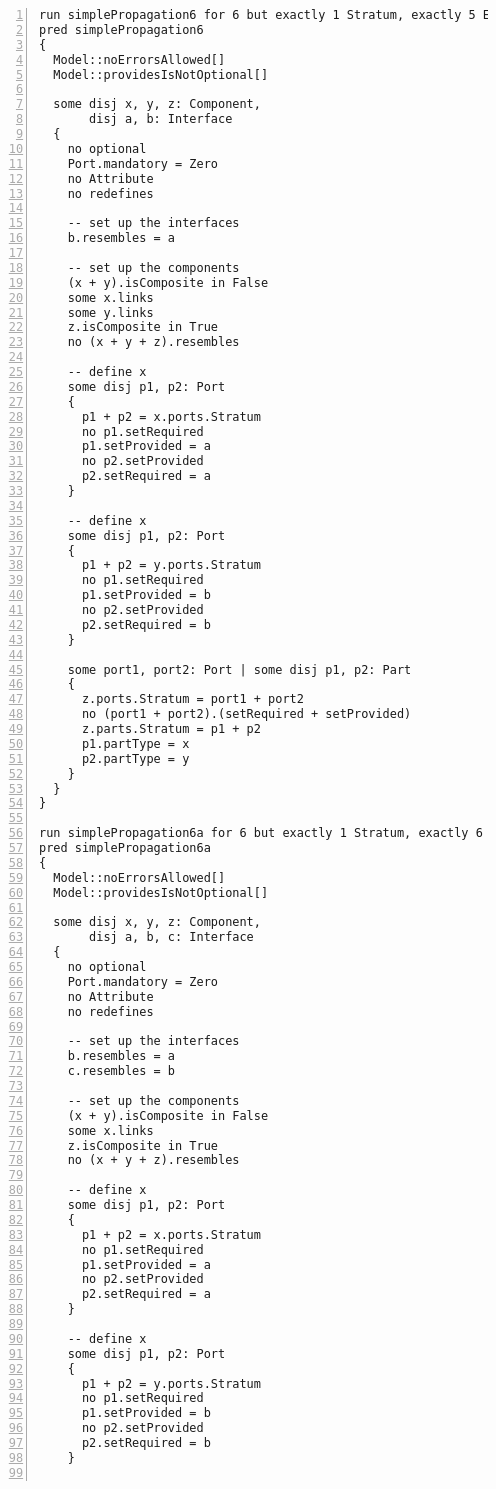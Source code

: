 \begin{lstlisting}[caption={unittests\_inference.als}, numbers=left]
run simplePropagation6 for 6 but exactly 1 Stratum, exactly 5 Element, exactly 6 Port, exactly 2 Part, exactly 3 Component, exactly 2 Interface, exactly 3 Connector, 10 LinkEnd, 6 ConnectorEnd
pred simplePropagation6
{
  Model::noErrorsAllowed[]
  Model::providesIsNotOptional[]

  some disj x, y, z: Component,
       disj a, b: Interface
  {
    no optional
    Port.mandatory = Zero
    no Attribute
    no redefines
  
    -- set up the interfaces
    b.resembles = a    
  
    -- set up the components
    (x + y).isComposite in False
    some x.links
    some y.links
    z.isComposite in True
    no (x + y + z).resembles
    
    -- define x
    some disj p1, p2: Port
    {
      p1 + p2 = x.ports.Stratum
      no p1.setRequired
      p1.setProvided = a
      no p2.setProvided
      p2.setRequired = a
    }
    
    -- define x
    some disj p1, p2: Port
    {
      p1 + p2 = y.ports.Stratum
      no p1.setRequired
      p1.setProvided = b
      no p2.setProvided
      p2.setRequired = b
    }
    
    some port1, port2: Port | some disj p1, p2: Part
    {
      z.ports.Stratum = port1 + port2
      no (port1 + port2).(setRequired + setProvided)
      z.parts.Stratum = p1 + p2
      p1.partType = x
      p2.partType = y
    }
  }
}

run simplePropagation6a for 6 but exactly 1 Stratum, exactly 6 Element, exactly 6 Port, exactly 2 Part, exactly 3 Component, exactly 3 Interface, exactly 3 Connector, 10 LinkEnd, 6 ConnectorEnd
pred simplePropagation6a
{
  Model::noErrorsAllowed[]
  Model::providesIsNotOptional[]

  some disj x, y, z: Component,
       disj a, b, c: Interface
  {
    no optional
    Port.mandatory = Zero
    no Attribute
    no redefines
  
    -- set up the interfaces
    b.resembles = a
    c.resembles = b
  
    -- set up the components
    (x + y).isComposite in False
    some x.links
    z.isComposite in True
    no (x + y + z).resembles
    
    -- define x
    some disj p1, p2: Port
    {
      p1 + p2 = x.ports.Stratum
      no p1.setRequired
      p1.setProvided = a
      no p2.setProvided
      p2.setRequired = a
    }
    
    -- define x
    some disj p1, p2: Port
    {
      p1 + p2 = y.ports.Stratum
      no p1.setRequired
      p1.setProvided = b
      no p2.setProvided
      p2.setRequired = b
    }
    

\end{lstlisting}
